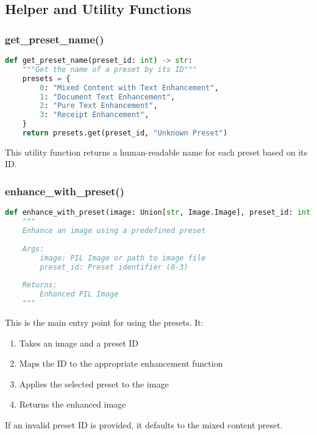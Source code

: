 \subsection{Helper and Utility Functions}

\subsubsection{get\_preset\_name()}
\begin{lstlisting}[language=Python, caption=Preset Name Retrieval Function]
def get_preset_name(preset_id: int) -> str:
    """Get the name of a preset by its ID"""
    presets = {
        0: "Mixed Content with Text Enhancement",
        1: "Document Text Enhancement",
        2: "Pure Text Enhancement",
        3: "Receipt Enhancement",
    }
    return presets.get(preset_id, "Unknown Preset")
\end{lstlisting}

This utility function returns a human-readable name for each preset based on its ID.

\subsubsection{enhance\_with\_preset()}
\begin{lstlisting}[language=Python, caption=Preset Selection Function]
def enhance_with_preset(image: Union[str, Image.Image], preset_id: int) -> Image.Image:
    """
    Enhance an image using a predefined preset
    
    Args:
        image: PIL Image or path to image file
        preset_id: Preset identifier (0-3)
        
    Returns:
        Enhanced PIL Image
    """
\end{lstlisting}

This is the main entry point for using the presets. It:
\begin{enumerate}
    \item Takes an image and a preset ID
    \item Maps the ID to the appropriate enhancement function
    \item Applies the selected preset to the image
    \item Returns the enhanced image
\end{enumerate}

If an invalid preset ID is provided, it defaults to the mixed content preset.

